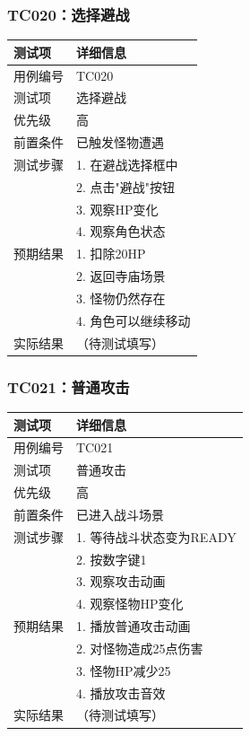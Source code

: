\documentclass[a4paper,12pt]{article}
\begin{document}
\subsubsection{TC020：选择避战}
\begin{table}[h]
\centering
\begin{tabular}{ll}
\toprule
测试项 & 详细信息 \\
\midrule
用例编号 & TC020 \\
测试项 & 选择避战 \\
优先级 & 高 \\
前置条件 & 已触发怪物遭遇 \\
测试步骤 & 1. 在避战选择框中 \\
 & 2. 点击"避战"按钮 \\
 & 3. 观察HP变化 \\
 & 4. 观察角色状态 \\
预期结果 & 1. 扣除20HP \\
 & 2. 返回寺庙场景 \\
 & 3. 怪物仍然存在 \\
 & 4. 角色可以继续移动 \\
实际结果 & （待测试填写） \\
\bottomrule
\end{tabular}
\end{table}

\subsubsection{TC021：普通攻击}
\begin{table}[h]
\centering
\begin{tabular}{ll}
\toprule
测试项 & 详细信息 \\
\midrule
用例编号 & TC021 \\
测试项 & 普通攻击 \\
优先级 & 高 \\
前置条件 & 已进入战斗场景 \\
测试步骤 & 1. 等待战斗状态变为READY \\
 & 2. 按数字键1 \\
 & 3. 观察攻击动画 \\
 & 4. 观察怪物HP变化 \\
预期结果 & 1. 播放普通攻击动画 \\
 & 2. 对怪物造成25点伤害 \\
 & 3. 怪物HP减少25 \\
 & 4. 播放攻击音效 \\
实际结果 & （待测试填写） \\
\bottomrule
\end{tabular}
\end{table}
\end{document}
